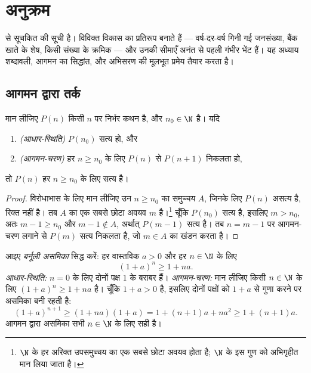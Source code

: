 \chapter{अनुक्रम}\label{ch:g12:seq}

  से सूचकित  की सूची है। 
विविक्त विकास का प्रतिरूप बनाते हैं --- वर्ष-दर-वर्ष गिनी गई जनसंख्या, बैंक
खाते के शेष, किसी संख्या के क्रमिक  --- और उनकी सीमाएँ अनंत से पहली
गंभीर भेंट हैं। यह अध्याय शब्दावली, आगमन का सिद्धांत, और अभिसरण की मूलभूत
प्रमेय तैयार करता है।

\section{आगमन द्वारा तर्क}

\begin{theorem}[आगमन का सिद्धांत]\label{thm:g12:seq:induction}
मान लीजिए $P(n)$ किसी  $n$ पर निर्भर कथन है, और $n_0 \in \N$ है। यदि
\begin{enumerate}
  \item \emph{(आधार-स्थिति)} $P(n_0)$ सत्य हो, और
  \item \emph{(आगमन-चरण)} हर $n \geq n_0$ के लिए $P(n)$ से $P(n+1)$ निकलता हो,
\end{enumerate}
तो $P(n)$ हर $n \geq n_0$ के लिए सत्य है।
\end{theorem}

\begin{proof}
विरोधाभास के लिए मान लीजिए उन  $n \geq n_0$ का समुच्चय $A$, जिनके लिए
$P(n)$ असत्य है, रिक्त नहीं है। तब $A$ का एक सबसे छोटा अवयव $m$ है।\footnote{$\N$
के हर अरिक्त उपसमुच्चय का एक सबसे छोटा अवयव होता है; $\N$ के इस गुण को
अभिगृहीत मान लिया जाता है।} चूँकि $P(n_0)$ सत्य है, इसलिए $m > n_0$, अतः $m - 1 \geq n_0$ और
$m-1 \notin A$, अर्थात् $P(m-1)$ सत्य है। तब $n = m-1$ पर आगमन-चरण लगाने से $P(m)$ सत्य निकलता
है, जो $m \in A$ का खंडन करता है।
\end{proof}

\begin{example}\label{ex:g12:seq:bernoulli}
आइए \emph{बर्नूली असमिका} सिद्ध करें: हर वास्तविक $a > 0$ और हर $n \in \N$ के लिए
\[
(1+a)^n \geq 1 + na.
\]
\emph{आधार-स्थिति:} $n = 0$ के लिए दोनों पक्ष $1$ के बराबर हैं।
\emph{आगमन-चरण:} मान लीजिए किसी $n \in \N$ के लिए $(1+a)^n \geq 1+na$ है। चूँकि $1 + a > 0$ है, इसलिए
दोनों पक्षों को $1+a$ से गुणा करने पर असमिका बनी रहती है:
\[
(1+a)^{n+1} \geq (1+na)(1+a) = 1 + (n+1)a + na^2 \geq 1 + (n+1)a .
\]
आगमन द्वारा असमिका सभी $n \in \N$ के लिए सही है।
\end{example}

